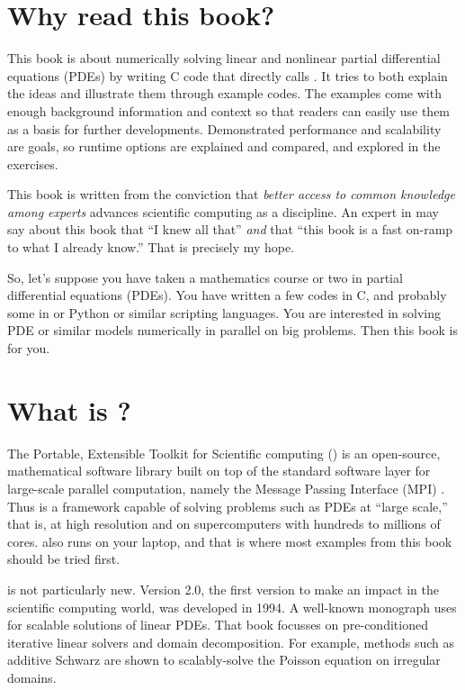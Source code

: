 
\section{Why read this book?}

This book is about numerically solving linear and nonlinear partial differential equations (PDEs) by writing C code \citep{KernighanRitchie1988} that directly calls \PETSc.  It tries to both explain the ideas and illustrate them through example codes.  The examples come with enough background information and context so that readers can easily use them as a basis for further developments.  Demonstrated performance and scalability are goals, so runtime options are explained and compared, and explored in the exercises.

This book is written from the conviction that \emph{better access to common knowledge among experts} advances scientific computing as a discipline.  An expert in \PETSc may say about this book that ``I knew all that'' \emph{and} that ``this book is a fast on-ramp to what I already know.''  That is precisely my hope.

So, let's suppose you have taken a mathematics course or two in partial differential equations (PDEs).  You have written a few codes in C, and probably some in \Matlab or Python or similar scripting languages.  You are interested in solving PDE or similar models numerically in parallel on big problems.  Then this book is for you.

\section{What is \PETSc?}

The Portable, Extensible Toolkit for Scientific computing (\PETSc) is an open-source, mathematical software library built on top of the standard software layer for large-scale parallel computation, namely the Message Passing Interface (MPI) \citep{Groppetal1999}.  Thus \PETSc is a framework capable of solving problems such as PDEs at ``large scale,'' that is, at high resolution and on supercomputers with hundreds to millions of cores.  \PETSc also runs on your laptop, and that is where most examples from this book should be tried first.

\PETSc is not particularly new.  Version 2.0, the first version to make an impact in the scientific computing world, was developed in 1994.  A well-known monograph \citet{Smithetal1996} uses  for scalable solutions of linear PDEs.  That book focusses on pre-conditioned iterative linear solvers and domain decomposition.  For example, methods such as additive Schwarz are shown to scalably-solve the Poisson equation on irregular domains.

